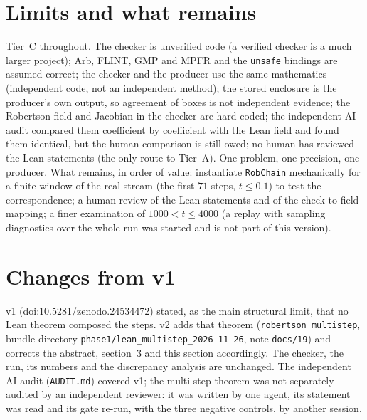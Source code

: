 \documentclass[11pt]{article}
\begin{document}
\section{Limits and what remains}
Tier~C throughout. The checker is unverified code (a verified checker is a much larger project); Arb, FLINT, GMP and MPFR and the \texttt{unsafe} bindings are assumed correct; the checker and the producer use the same mathematics
(independent code, not an independent method); the stored enclosure is the producer's own output, so agreement of boxes is not independent evidence; the Robertson field and Jacobian in the checker are hard-coded;
the independent AI audit compared them coefficient by coefficient with the Lean field and found them identical, but the human comparison is still owed; no human has reviewed the Lean statements (the only route to Tier~A). One problem, one precision, one producer.
What remains, in order of value: instantiate \texttt{RobChain} mechanically for a finite window of the real stream (the first $71$ steps, $t\le0.1$) to test the correspondence; a human review of the Lean statements and of the check-to-field mapping; a finer examination of $1000<t\le4000$ (a replay with sampling diagnostics over the whole run was started and is not part of this version).

\section*{Changes from v1}
v1 (doi:10.5281/zenodo.24534472) stated, as the main structural limit, that no Lean theorem composed the steps. v2 adds that theorem (\texttt{robertson\_multistep}, bundle directory \texttt{phase1/lean\_multistep\_2026-11-26}, note \texttt{docs/19}) and corrects the abstract, section~3 and this section accordingly.
The checker, the run, its numbers and the discrepancy analysis are unchanged. The independent AI audit (\texttt{AUDIT.md}) covered v1; the multi-step theorem was not separately audited by an independent reviewer: it was written by one agent, its statement was read and its gate re-run, with the three negative controls, by another session.
\end{document}
